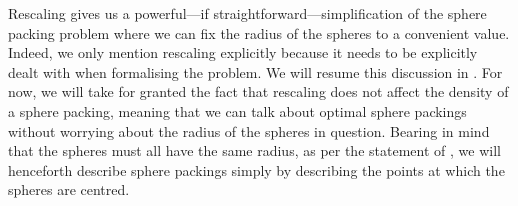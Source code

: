 Rescaling gives us a powerful---if straightforward---simplification of the sphere packing problem where we can fix the radius of the spheres to a convenient value. Indeed, we only mention rescaling explicitly because it needs to be explicitly dealt with when formalising the problem. We will resume this discussion in . For now, we will take for granted the fact that rescaling does not affect the density of a sphere packing, meaning that we can talk about optimal sphere packings without worrying about the radius of the spheres in question. Bearing in mind that the spheres must all have the same radius, as per the statement of , we will henceforth describe sphere packings simply by describing the points at which the spheres are centred.



